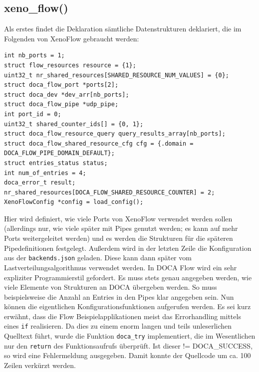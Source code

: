 \subsection{xeno\_flow()}
Als erstes findet die Deklaration sämtliche Datenstrukturen deklariert, die im Folgenden von XenoFlow gebraucht werden:
\begin{verbatim}
int nb_ports = 1;
struct flow_resources resource = {1};
uint32_t nr_shared_resources[SHARED_RESOURCE_NUM_VALUES] = {0};
struct doca_flow_port *ports[2];
struct doca_dev *dev_arr[nb_ports];
struct doca_flow_pipe *udp_pipe;
int port_id = 0;
uint32_t shared_counter_ids[] = {0, 1};
struct doca_flow_resource_query query_results_array[nb_ports];
struct doca_flow_shared_resource_cfg cfg = {.domain = DOCA_FLOW_PIPE_DOMAIN_DEFAULT};
struct entries_status status;
int num_of_entries = 4;
doca_error_t result;
nr_shared_resources[DOCA_FLOW_SHARED_RESOURCE_COUNTER] = 2;
XenoFlowConfig *config = load_config();
\end{verbatim}
Hier wird definiert, wie viele Ports von XenoFlow verwendet werden sollen (allerdings nur, wie viele später mit Pipes genutzt werden; es kann auf mehr Ports weitergeleitet werden) und es werden die Strukturen für die späteren Pipedefinitionen festgelegt. Außerdem wird in der letzten Zeile die Konfiguration aus der \texttt{backends.json} geladen. Diese kann dann später vom Lastverteilungsalgorithmus verwendet werden. In DOCA Flow wird ein sehr expliziter Programmierstil gefordert. Es muss stets genau angegeben werden, wie viele Elemente von Strukturen an DOCA übergeben werden. So muss beispielsweise die Anzahl an Entries in den Pipes klar angegeben sein.
\newline
Nun können die eigentlichen Konfigurationsfunktionen aufgerufen werden. Es sei kurz erwähnt, dass die Flow Beispielapplikationen meist das Errorhandling mittels eines \texttt{if} realisieren. Da dies zu einem enorm langen und teils unleserlichen Quelltext führt, wurde die Funktion \texttt{doca\_try} implementiert, die im Wesentlichen nur den \texttt{return} des Funktionsaufrufs überprüft. Ist dieser != DOCA\_SUCCESS, so wird eine Fehlermeldung ausgegeben. Damit konnte der Quellcode um ca. 100 Zeilen verkürzt werden.
